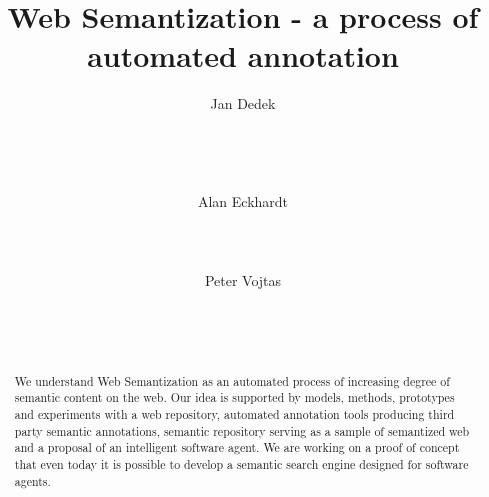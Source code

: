 \documentclass{www2009-submission}
\begin{document}
%
\title{Web Semantization - a process of automated annotation}


\author{
\alignauthor Jan Dedek\\
       \\
       \\
       \\
       \\
\alignauthor Alan Eckhardt\\
       \\
       \\
       \\
\alignauthor Peter Vojtas\\
       \\
       \\
       \\
}

\maketitle
\begin{abstract}
We understand Web Semantization as an automated process of increasing degree of semantic content on the web. %
Our idea is supported by models, methods, prototypes and experiments with a web repository, automated annotation tools producing third party semantic annotations, semantic repository serving as a sample of semantized web and a proposal of an intelligent software agent. We are working on a proof of concept that even today it is possible to develop a semantic search engine designed for software agents.
\end{abstract}

\end{document}
